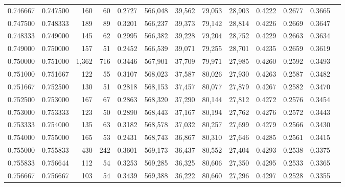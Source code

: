 \begin{tabular}{rrrrrrrrrrrrr}
0.746667 & 0.747500 &   160 &  60 &                                     0.2727 & 566,048 &  39,562 &  79,053 &  28,903 & 0.4222 & 0.2677 & 0.3665 \\
0.747500 & 0.748333 &   189 &  89 &                                     0.3201 & 566,237 &  39,373 &  79,142 &  28,814 & 0.4226 & 0.2669 & 0.3647 \\
0.748333 & 0.749000 &   145 &  62 &                                     0.2995 & 566,382 &  39,228 &  79,204 &  28,752 & 0.4229 & 0.2663 & 0.3634 \\
0.749000 & 0.750000 &   157 &  51 &                                     0.2452 & 566,539 &  39,071 &  79,255 &  28,701 & 0.4235 & 0.2659 & 0.3619 \\
0.750000 & 0.751000 & 1,362 & 716 &                                     0.3446 & 567,901 &  37,709 &  79,971 &  27,985 & 0.4260 & 0.2592 & 0.3493 \\
0.751000 & 0.751667 &   122 &  55 &                                     0.3107 & 568,023 &  37,587 &  80,026 &  27,930 & 0.4263 & 0.2587 & 0.3482 \\
0.751667 & 0.752500 &   130 &  51 &                                     0.2818 & 568,153 &  37,457 &  80,077 &  27,879 & 0.4267 & 0.2582 & 0.3470 \\
0.752500 & 0.753000 &   167 &  67 &                                     0.2863 & 568,320 &  37,290 &  80,144 &  27,812 & 0.4272 & 0.2576 & 0.3454 \\
0.753000 & 0.753333 &   123 &  50 &                                     0.2890 & 568,443 &  37,167 &  80,194 &  27,762 & 0.4276 & 0.2572 & 0.3443 \\
0.753333 & 0.754000 &   135 &  63 &                                     0.3182 & 568,578 &  37,032 &  80,257 &  27,699 & 0.4279 & 0.2566 & 0.3430 \\
0.754000 & 0.755000 &   165 &  53 &                                     0.2431 & 568,743 &  36,867 &  80,310 &  27,646 & 0.4285 & 0.2561 & 0.3415 \\
0.755000 & 0.755833 &   430 & 242 &                                     0.3601 & 569,173 &  36,437 &  80,552 &  27,404 & 0.4293 & 0.2538 & 0.3375 \\
0.755833 & 0.756644 &   112 &  54 &                                     0.3253 & 569,285 &  36,325 &  80,606 &  27,350 & 0.4295 & 0.2533 & 0.3365 \\
0.756667 & 0.756667 &   103 &  54 &                                     0.3439 & 569,388 &  36,222 &  80,660 &  27,296 & 0.4297 & 0.2528 & 0.3355 \\

\end{tabular}
